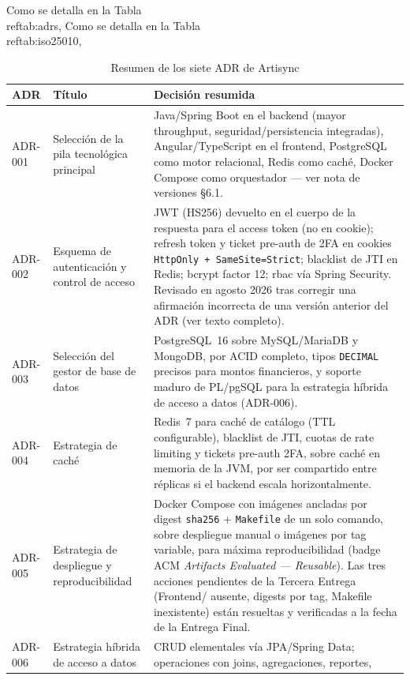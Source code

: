 Como se detalla en la Tabla~\\ref{tab:adrs}, 
Como se detalla en la Tabla~\\ref{tab:iso25010}, 
\begin{table}[H]
\centering
\caption{Resumen de los siete ADR de Artisync}
\label{tab:adrs}
\begin{tabular}{@{}p{1.4cm}p{3.4cm}p{9.4cm}@{}}
\toprule
\textbf{ADR} & \textbf{Título} & \textbf{Decisión resumida} \\
\midrule
ADR-001 & Selección de la pila tecnológica principal & Java/Spring Boot en
  el backend (mayor throughput, seguridad/persistencia integradas),
  Angular/TypeScript en el frontend, PostgreSQL como motor relacional,
  Redis como caché, Docker Compose como orquestador --- ver nota de
  versiones \S6.1. \\
ADR-002 & Esquema de autenticación y control de acceso & JWT (HS256)
  devuelto en el cuerpo de la respuesta para el access token (no en
  cookie); refresh token y ticket pre-auth de 2FA en cookies
  \texttt{HttpOnly + SameSite=Strict}; blacklist de JTI en Redis; bcrypt
  factor 12; \gls{rbac} vía Spring Security. Revisado en agosto 2026 tras
  corregir una afirmación incorrecta de una versión anterior del ADR (ver
  texto completo). \\
ADR-003 & Selección del gestor de base de datos & PostgreSQL~16 sobre
  MySQL/MariaDB y MongoDB, por ACID completo, tipos \texttt{DECIMAL}
  precisos para montos financieros, y soporte maduro de PL/pgSQL para la
  estrategia híbrida de acceso a datos (ADR-006). \\
ADR-004 & Estrategia de caché & Redis~7 para caché de catálogo (TTL
  configurable), blacklist de JTI, cuotas de rate limiting y tickets
  pre-auth 2FA, sobre caché en memoria de la JVM, por ser compartido entre
  réplicas si el backend escala horizontalmente. \\
ADR-005 & Estrategia de despliegue y reproducibilidad & Docker Compose con
  imágenes ancladas por digest \texttt{sha256} + \texttt{Makefile} de un
  solo comando, sobre despliegue manual o imágenes por tag variable, para
  máxima reproducibilidad (badge ACM \emph{Artifacts Evaluated ---
  Reusable}). Las tres acciones pendientes de la Tercera Entrega
  (Frontend/ ausente, digests por tag, Makefile inexistente) están
  resueltas y verificadas a la fecha de la Entrega Final. \\
ADR-006 & Estrategia híbrida de acceso a datos & CRUD elementales vía
  JPA/Spring Data; operaciones con joins, agregaciones, reportes,

\end{tabular}
\end{table}
